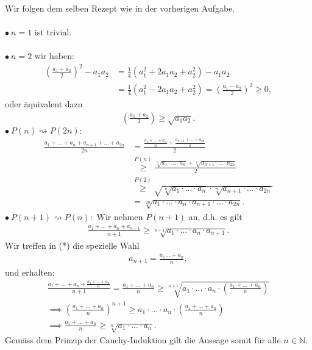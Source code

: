 \documentclass[a4paper, 20]{exam}
\begin{document}
\begin{solution} Wir folgen dem selben Rezept wie in der vorherigen Aufgabe. \\
\\
$\bullet \ n=1$ ist trivial. 
\\\\
$\bullet \ n=2$ wir haben: 
\begin{align*}
\left( \frac{a_1 + a_2}{2}\right)^2- a_1a_2& = \frac{1}{4}( a_1^2 + 2 a_1 a_2 + a_2^2) -a_1a_2 \\
&= \frac{1}{4}( a_1^2-2a_1a_2+a_2^2) = \left( \frac{a_1-a_2}{2}\right)^2 \geq 0,
\end{align*}
oder äquivalent dazu 
\begin{align*}
 \left( \frac{a_1+a_2}{2}\right) \geq \sqrt{ a_1a_2}.
\end{align*}
$\bullet \ P(n) \rightsquigarrow P(2n):$ 
\begin{align*}
\frac{a_1 + \dots + a_n + a_{n+1} + \dots + a_{2n}}{2n}&= \frac{\frac{a_1 + \dots + a_n}{n} + \frac{a_{n+1}+ \dots + a_{2n}}{n}}{2} \\
&\overset{P(n)} \geq  \frac{\sqrt[n]{a_1 \cdot ... \cdot a_n} + \sqrt[n]{a_{n+1} \cdot ...\cdot a_{2n}}}{2} \\
& \overset{P(2)}\geq \sqrt{ \sqrt[n]{a_1 \cdot ... \cdot a_n} \cdot \sqrt[n]{a_{n+1} \cdot ... \cdot a_{2n}}} \\
&= \sqrt[2n]{a_1 \cdot ... \cdot a_n \cdot a_{n+1} \cdot ... \cdot a_{2n}}.
\end{align*}
$\bullet \ P(n+1) \rightsquigarrow P(n):$ Wir nehmen $P(n+1)$ an, d.h. es gilt 
\begin{align*}
\frac{a_1 + \dots + a_n + a_{n+1}}{n+1} \geq \sqrt[n+1]{a_1 \cdot ... \cdot a_n \cdot a_{n+1}}. \tag{*}
\end{align*}
Wir treffen in (*) die spezielle Wahl
\begin{align*}
a_{n+1} = \frac{a_1 \dots + a_n}{n},
\end{align*}
und erhalten:
\begin{align*}
\frac{a_1 + \dots + a_n + \frac{a_1 + \dots + a_n}{n}}{n+1} = \frac{a_1 + \dots + a_n}{n} \geq \sqrt[n+1]{a_1 \cdot ... \cdot a_n \cdot \left( \frac{a_1 + \dots + a_n}{n}\right)}
\\
\implies \left( \frac{a_1 + \dots + a_n}{n}\right)^{n+1} \geq a_1 \cdot ... \cdot a_n \cdot \left( \frac{a_1 + \dots + a_n}{n}\right) \\
\implies \frac{a_1 + \dots + a_n}{n} \geq \sqrt[n]{a_1 \cdot ... \cdot a_n}.
\end{align*}
Gemäss dem Prinzip der Cauchy-Induktion gilt die Aussage somit für alle $n \in \mathbb{N}$. 
\end{solution}
\end{document}
